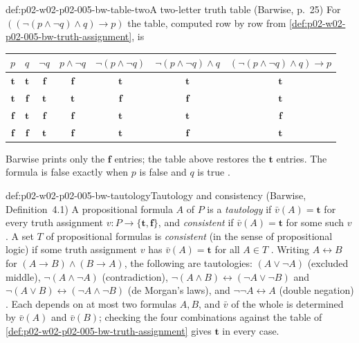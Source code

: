 \begin{hbexample}{def:p02-w02-p02-005-bw-table-two}{A two-letter truth table (Barwise, p.~25)}
For \(((\neg(p\land\neg q)\land q)\to p)\) the table, computed row by row
from \cref{def:p02-w02-p02-005-bw-truth-assignment}, is
\begin{center}
\begin{tabular}{cc|ccccc}
\(p\) & \(q\) & \(\neg q\) & \(p\land\neg q\) & \(\neg(p\land\neg q)\) &
\(\neg(p\land\neg q)\land q\) & \((\neg(p\land\neg q)\land q)\to p\)\\
\hline
\(\mathbf t\) & \(\mathbf t\) & \(\mathbf f\) & \(\mathbf f\) & \(\mathbf t\) & \(\mathbf t\) & \(\mathbf t\)\\
\(\mathbf t\) & \(\mathbf f\) & \(\mathbf t\) & \(\mathbf t\) & \(\mathbf f\) & \(\mathbf f\) & \(\mathbf t\)\\
\(\mathbf f\) & \(\mathbf t\) & \(\mathbf f\) & \(\mathbf f\) & \(\mathbf t\) & \(\mathbf t\) & \(\mathbf f\)\\
\(\mathbf f\) & \(\mathbf f\) & \(\mathbf t\) & \(\mathbf f\) & \(\mathbf t\) & \(\mathbf f\) & \(\mathbf t\)
\end{tabular}
\end{center}
Barwise prints only the \(\mathbf f\) entries; the table above restores the
\(\mathbf t\) entries.  The formula is false exactly when \(p\) is false and
\(q\) is true \cite[ch.~A.1, \S4, pp.~24--25]{Barwise1977FirstOrder}.
\end{hbexample}

\begin{hbdefinition}{def:p02-w02-p02-005-bw-tautology}{Tautology and consistency (Barwise, Definition~4.1)}
A propositional formula \(A\) of \(P\) is a \emph{tautology} if
\(\bar v(A)=\mathbf t\) for every truth assignment
\(v:P\to\{\mathbf t,\mathbf f\}\), and \emph{consistent} if
\(\bar v(A)=\mathbf t\) for some such \(v\).  A set \(T\) of propositional
formulas is \emph{consistent} (in the sense of propositional logic) if some
truth assignment \(v\) has \(\bar v(A)=\mathbf t\) for all \(A\in T\)
\cite[ch.~A.1, \S4, Definition~4.1, p.~25; p.~26]{Barwise1977FirstOrder}.
Writing \(A\leftrightarrow B\) for \((A\to B)\land(B\to A)\), the following
are tautologies: \((A\lor\neg A)\) (excluded middle),
\(\neg(A\land\neg A)\) (contradiction),
\(\neg(A\land B)\leftrightarrow(\neg A\lor\neg B)\) and
\(\neg(A\lor B)\leftrightarrow(\neg A\land\neg B)\) (de Morgan's laws), and
\(\neg\neg A\leftrightarrow A\) (double negation)
\cite[ch.~A.1, \S4, p.~25]{Barwise1977FirstOrder}.  Each depends on at
most two formulas \(A,B\), and \(\bar v\) of the whole is determined by
\(\bar v(A)\) and \(\bar v(B)\); checking the four combinations against the
table of \cref{def:p02-w02-p02-005-bw-truth-assignment} gives
\(\mathbf t\) in every case.
\end{hbdefinition}

